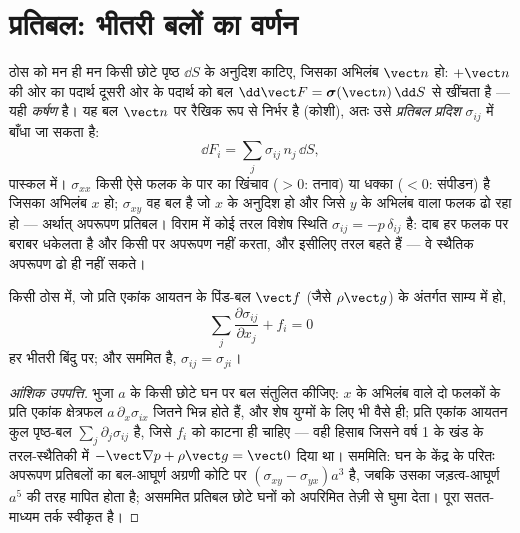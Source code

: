 \section{प्रतिबल: भीतरी बलों का वर्णन}

\begin{definition}[कर्षण और प्रतिबल प्रदिश]\label{def:b3:continuum-elasticity:stress}
ठोस को मन ही मन किसी छोटे पृष्ठ $\dd S$ के अनुदिश काटिए, जिसका अभिलंब
$\vect n$ हो: $+\vect n$ की ओर का पदार्थ दूसरी ओर के पदार्थ को
बल $\dd\vect F = \boldsymbol\sigma(\vect n)\,\dd S$ से खींचता है ---
यही \emph{कर्षण} है। यह बल $\vect n$ पर रैखिक रूप से निर्भर है (कोशी),
अतः उसे \emph{प्रतिबल प्रदिश} $\sigma_{ij}$ में बाँधा जा सकता है:
\[
\dd F_i = \sum_j \sigma_{ij}\,n_j\,\dd S ,
\]
पास्कल में। $\sigma_{xx}$ किसी ऐसे फलक के पार का खिंचाव ($> 0$: तनाव)
या धक्का ($< 0$: संपीडन) है जिसका अभिलंब $x$ हो; $\sigma_{xy}$ वह बल है
जो $x$ के अनुदिश हो और जिसे $y$ के अभिलंब वाला फलक ढो रहा हो ---
अर्थात् अपरूपण प्रतिबल। विराम में कोई तरल विशेष स्थिति
$\sigma_{ij} = -p\,\delta_{ij}$ है: दाब हर फलक पर बराबर धकेलता है और
किसी पर अपरूपण नहीं करता, और इसीलिए तरल बहते हैं --- वे स्थैतिक अपरूपण
ढो ही नहीं सकते।
\end{definition}

\begin{proposition}[साम्य और सममिति]\label{prop:b3:continuum-elasticity:equilibrium}
किसी ठोस में, जो प्रति एकांक आयतन के पिंड-बल $\vect f$ (जैसे
$\rho\vect g$) के अंतर्गत साम्य में हो,
\[
\sum_j\frac{\partial\sigma_{ij}}{\partial x_j} + f_i = 0
\]
हर भीतरी बिंदु पर; और  सममित है,
$\sigma_{ij} = \sigma_{ji}$।
\end{proposition}

\begin{proof}[आंशिक उपपत्ति]
भुजा $a$ के किसी छोटे घन पर बल संतुलित कीजिए: $x$ के अभिलंब वाले दो
फलकों के  प्रति एकांक क्षेत्रफल $a\,\partial_x\sigma_{ix}$ जितने
भिन्न होते हैं, और शेष युग्मों के लिए भी वैसे ही; प्रति एकांक आयतन कुल
पृष्ठ-बल $\sum_j\partial_j\sigma_{ij}$ है, जिसे $f_i$ को काटना ही चाहिए
--- वही हिसाब जिसने वर्ष 1 के खंड के तरल-स्थैतिकी में
$-\vect\nabla p + \rho\vect g = \vect 0$ दिया था। सममिति: घन के केंद्र
के परितः अपरूपण प्रतिबलों का बल-आघूर्ण अग्रणी कोटि पर $(\sigma_{xy} -
\sigma_{yx})a^3$ है, जबकि उसका जड़त्व-आघूर्ण
$a^5$ की तरह मापित होता है; असममित प्रतिबल छोटे घनों को अपरिमित तेज़ी
से घुमा देता। पूरा सतत-माध्यम तर्क स्वीकृत है।
\end{proof}

